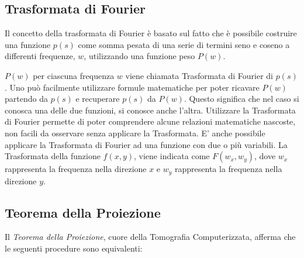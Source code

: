 \documentclass[a4paper,12pt, doubleside]{report}
\begin{document}
                \bigskip
                               
            \subsection{Trasformata di Fourier}
                \par
                    Il concetto della trasformata di Fourier è basato sul fatto che è possibile costruire una funzione $p(s)$ come somma pesata di una serie di termini seno e coseno a differenti frequenze, $w$, utilizzando una funzione peso $P(w)$.
                
                \bigskip
                \par
                    $P(w)$ per ciascuna frequenza $w$ viene chiamata Trasformata di Fourier di $p(s)$. Uno può facilmente utilizzare formule matematiche per poter ricavare $P(w)$ partendo da $p(s)$ e recuperare $p(s)$ da $P(w)$. Questo significa che nel caso si conosca una delle due funzioni, si conosce anche l'altra. Utilizzare la Trasformata di Fourier permette di poter comprendere alcune relazioni matematiche nascoste, non facili da osservare senza applicare la Trasformata. E' anche possibile applicare la Trasformata di Fourier ad una funzione con due o più variabili. La Trasformata della funzione $f(x,y)$, viene indicata come $F(w_x,w_y)$, dove $w_x$ rappresenta la frequenza nella direzione $x$ e $w_y$ rappresenta la frequenza nella direzione $y$.
                    
            \subsection{Teorema della Proiezione}
                \par
                    Il \textit{Teorema della Proiezione}, cuore della Tomografia Computerizzata, afferma che le seguenti procedure sono equivalenti:
        
\end{document}
